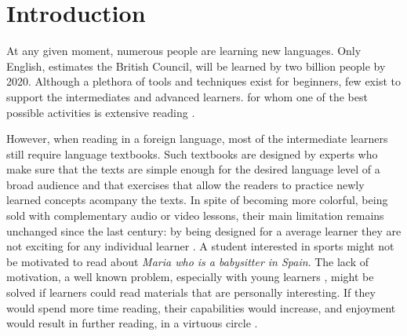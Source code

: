
\section{Introduction}
At any given moment, numerous people are learning new languages. 
Only English, estimates the British Council, will be learned by two billion people by 2020. 
Although a plethora of tools and techniques exist for beginners, few exist to support the intermediates and advanced learners. for whom one of the best possible activities is extensive reading
\cite{Day98-Extensive,mccarthy1999-extensive,mccarthy1999-microcosm}. 


However, when reading in a foreign language, most of the intermediate learners still require language textbooks. Such textbooks are designed by experts who make sure that the texts are simple enough for the desired language level of a broad audience and that exercises that allow the readers to practice newly learned concepts acompany the texts. 
In spite of becoming more colorful, being sold with complementary audio or video lessons, their main limitation remains unchanged since the last century: 
by being designed for a average learner they are not exciting for any individual learner \cite{Hidi00-TheUnmotivated}. A student interested in sports might not be motivated to read about {\em Maria who is a babysitter in Spain}. 
% 
The lack of motivation, a well known problem, especially with young learners \cite{Hidi00-TheUnmotivated,renadya07-power}, might be solved if learners could read materials that are personally interesting. If they would spend more time reading, their capabilities would increase, and enjoyment would result in further reading, in a virtuous circle \cite{Brozo07-Engagement, Guthrie99-Motivation}.

